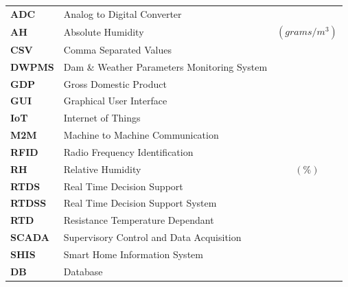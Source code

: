 \documentclass[a4paper,12pt]{report}
\begin{document}
\begin{table}[h]
  \begin{tabular}{l l c}
 \bf ADC & Analog to Digital Converter&\\
 \bf AH & Absolute Humidity &$(grams/m^3)$\\
 \bf CSV & Comma Separated Values\\
 \bf DWPMS & Dam \& Weather Parameters Monitoring System\\
 \bf GDP & Gross Domestic Product\\ 
 \bf GUI & Graphical User Interface\\
 \bf IoT & Internet of Things&\\
 \bf M2M & Machine to Machine Communication&\\
 \bf RFID & Radio Frequency Identification &\\
 \bf RH & Relative Humidity &$(\%)$\\
 \bf RTDS & Real Time Decision Support&\\
 \bf RTDSS & Real Time Decision Support System&\\ 
 \bf RTD & Resistance Temperature Dependant&\\ 
  \bf SCADA & Supervisory Control and Data Acquisition\\
\bf SHIS & Smart Home Information System &\\

 \bf DB & Database &\\
 \end{tabular}
\end{table}


\newpage
\vspace{1.5cm}
\end{document}
